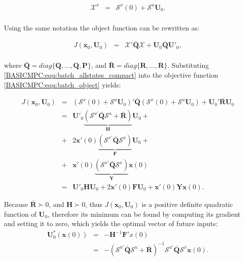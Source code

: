     \begin{equation}
        \begin{array}{rcl}
        \mathcal{X}^x&=&\mathcal{S}^x(0)+\mathcal{S}^u\textbf{U}_0.\\
		\end{array}
        \label{BASICMPC:equ:batch_allstates_compact}
    \end{equation}

    Using the same notation the object function can be rewritten as:

    \begin{equation}
        \begin{array}{rcl}
        J(\textbf{x}_0,\textbf{U}_0)&=&\mathcal{X}'\bar{\textbf{Q}}\mathcal{X}+\textbf{U}_0\bar{\textbf{Q}}\textbf{U}'_0,\\
		\end{array}
        \label{BASICMPC:equ:batch_object}
    \end{equation}

    where $\bar{\textbf{Q}}=diag\{\textbf{Q},\dots,\textbf{Q},\textbf{P}\}$, and $\bar{\textbf{R}}=diag\{\textbf{R},\dots,\textbf{R}\}$. Substituting \ref{BASICMPC:equ:batch_allstates_compact} into the objective function \ref{BASICMPC:equ:batch_object} yields:

    \begin{equation}
        \begin{array}{rcl}
        J(\textbf{x}_0,\textbf{U}_0)&=&(\mathcal{S}^x(0)+\mathcal{S}^u\textbf{U}_0)'\bar{\textbf{Q}}(\mathcal{S}^x(0)+\mathcal{S}^u\textbf{U}_0)+\textbf{U}_0'\bar{\textbf{R}}\textbf{U}_0\\
        &=&\textbf{U}'_0\underbrace{(\mathcal{S}^{u'}\bar{\textbf{Q}}\mathcal{S}^u+\bar{\textbf{R}})}_{\textbf{H}}\textbf{U}_0+ \\
        &+&2\textbf{x}'(0)\underbrace{(\mathcal{S}^{x'}\bar{\textbf{Q}}\mathcal{S}^u)}_{\textbf{F}}\textbf{U}_0+\\
        &+&\textbf{x}'(0)\underbrace{(\mathcal{S}^{x'}\bar{\textbf{Q}}\mathcal{S}^x)}_{\textbf{Y}}\textbf{x}(0)\\
        &=&\textbf{U}'_0\textbf{H}\textbf{U}_0+2\textbf{x}'(0)\textbf{F}\textbf{U}_0+\textbf{x}'(0)\textbf{Y}\textbf{x}(0).
		\end{array}
        \label{BASICMPC:equ:batch_simplfy}
    \end{equation}

    Because $\bar{\textbf{R}}\succ 0$, and $\textbf{H}\succ 0$, thus $J(\textbf{x}_0,\textbf{U}_0)$ is a positive definite quadratic function of $\textbf{U}_0$, therefore its minimum can be found by computing its gradient and setting it to zero, which yields the optimal vector of future inputs:
%
    \begin{equation}
        \begin{array}{rcl}
        \textbf{U}^*_0(\textbf{x}(0))&=&-\textbf{H}^{-1}\textbf{F}'x(0)\\
        &=&-(\mathcal{S}^{u'}\bar{\textbf{Q}}\mathcal{S}^{u}+\bar{\textbf{R}})^{-1}\mathcal{S}^{u'}\bar{\textbf{Q}}\mathcal{S}^{x}\textbf{x}(0).
		\end{array}
        \label{BASICMPC:equ:batch_optimal_solution}
    \end{equation}

